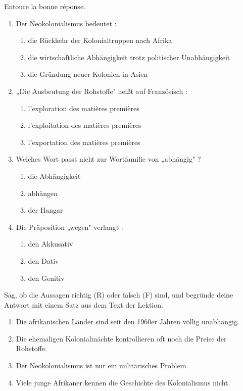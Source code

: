 \documentclass[11pt]{article}
\begin{document}
\begin{exercice}
Entoure la bonne réponse.
\begin{enumerate}
\item Der Neokolonialismus bedeutet :
\begin{enumerate}
\item die Rückkehr der Kolonialtruppen nach Afrika
\item die wirtschaftliche Abhängigkeit trotz politischer Unabhängigkeit
\item die Gründung neuer Kolonien in Asien
\end{enumerate}
\item „Die Ausbeutung der Rohstoffe" heißt auf Französisch :
\begin{enumerate}
\item l'exploration des matières premières
\item l'exploitation des matières premières
\item l'exportation des matières premières
\end{enumerate}
\item Welches Wort passt nicht zur Wortfamilie von „abhängig" ?
\begin{enumerate}
\item die Abhängigkeit
\item abhängen
\item der Hangar
\end{enumerate}
\item Die Präposition „wegen" verlangt :
\begin{enumerate}
\item den Akkusativ
\item den Dativ
\item den Genitiv
\end{enumerate}
\end{enumerate}
\end{exercice}

\begin{exercice}
Sag, ob die Aussagen richtig (R) oder falsch (F) sind, und begründe deine Antwort mit einem Satz aus dem Text der Lektion.
\begin{enumerate}
\item Die afrikanischen Länder sind seit den 1960er Jahren völlig unabhängig.
\item Die ehemaligen Kolonialmächte kontrollieren oft noch die Preise der Rohstoffe.
\item Der Neokolonialismus ist nur ein militärisches Problem.
\item Viele junge Afrikaner kennen die Geschichte des Kolonialismus nicht.
\end{enumerate}
\end{exercice}
\end{document}
